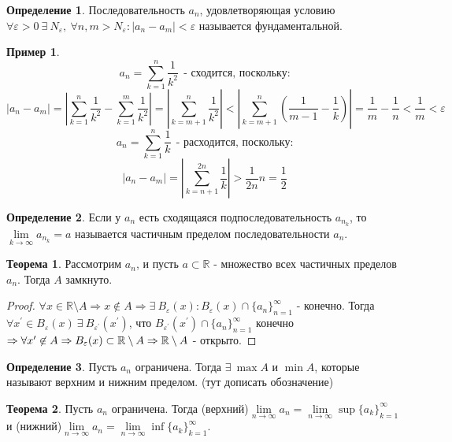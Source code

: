 \documentclass[a4paper, 12pt]{article}
\newcommand{\R}{\mathbb{R}}
\renewcommand{\epsilon}{\varepsilon}
\newcommand{\lims}{\lim\limits_{n\to \infty}}
\theoremstyle{definition}
\newtheorem*{definition}{Определение}
\newtheorem*{theorem}{Теорема}
\newtheorem*{example}{Пример}
\begin{document}
        \begin{definition}
            Последовательность $a_n$, удовлетворяющая условию\\ $\forall \epsilon>0\ \exists\ N_{\epsilon},\ \forall n,m>N_{\epsilon}: |a_n-a_m|<\epsilon$ называется фундаментальной.
        \end{definition} 
        \begin{example}
                \[a_n=\sum\limits_{k=1}^n\frac{1}{k^2}\ \ \text{- сходится, поскольку:}\] 
                \[|a_n-a_m|=|\sum\limits_{k=1}^n\frac{1}{k^2}-\sum\limits_{k=1}^m\frac{1}{k^2}|=|\sum\limits_{k=m+1}^n\frac{1}{k^2}|<|\sum\limits_{k=m+1}^n (\frac{1}{m-1}-\frac{1}{k})|=\frac{1}{m}-\frac{1}{n}<\frac{1}{m}<\epsilon\]
                \[a_n=\sum\limits_{k=1}^n\frac{1}{k}\ \ \text{- расходится, поскольку:}\]
                \[|a_n-a_m|=|\sum\limits_{k=n+1}^{2n}\frac{1}{k}|>\frac{1}{2n}n=\frac{1}{2}\]
        \end{example}
        \begin{definition}
            Если у $a_n$ есть сходящаяся подпоследовательность $a_{n_k}$, то\\ $\lim\limits_{k\to \infty}a_{n_k}=a$ называется частичным пределом последовательности $a_n$.
        \end{definition} 
        \begin{theorem}
            Рассмотрим $a_n$, и пусть $a\subset \R$ - множество всех частичных пределов $a_n$. Тогда $A$ замкнуто.
        \end{theorem} 
        \begin{proof}
            $\forall x\in \R\setminus A \Rightarrow x\not\in A \Rightarrow \exists\ B_{\epsilon}(x): B_{\epsilon}(x)\cap\{a_n\}_{n=1}^{\infty}$ - конечно. Тогда $\forall x^{\prime}\in B_{\epsilon}(x)\ \exists\ B_{\epsilon^{\prime}}(x^{\prime})$, что $B_{\epsilon^{\prime}}(x^{\prime})\cap\{a_n\}_{n=1}^{\infty}$ конечно $\Rightarrow \forall x^{\prime} \not\in A\\ \Rightarrow B_{\epsilon}(x)\subset \R\setminus A\Rightarrow \R\setminus A$ - открыто.
        \end{proof} 
        \begin{definition}
            Пусть $a_n$ ограничена. Тогда $\exists\ \max A$ и $\min A$, которые называют верхним и нижним пределом. (тут дописать обозначение)
        \end{definition} 
        \begin{theorem}
            Пусть  $a_n$ ограничена. Тогда (верхний)$\lims a_n=\lims \sup\{a_k\}_{k=1}^{\infty}$ и (нижний)$\lims a_n=\lims \inf\{a_k\}_{k=1}^{\infty}$.
        \end{theorem} 
\end{document}
